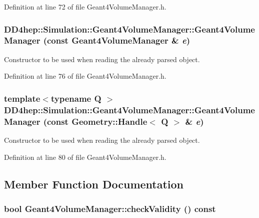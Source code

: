 Definition at line 72 of file Geant4VolumeManager.h.\hypertarget{class_d_d4hep_1_1_simulation_1_1_geant4_volume_manager_a8939c354de0d28fbf310fbac7c0c1f2b}{
\subsubsection[{Geant4VolumeManager}]{\setlength{\rightskip}{0pt plus 5cm}DD4hep::Simulation::Geant4VolumeManager::Geant4VolumeManager (const {\bf Geant4VolumeManager} \& {\em e})}}
\label{class_d_d4hep_1_1_simulation_1_1_geant4_volume_manager_a8939c354de0d28fbf310fbac7c0c1f2b}


Constructor to be used when reading the already parsed object. 

Definition at line 76 of file Geant4VolumeManager.h.\hypertarget{class_d_d4hep_1_1_simulation_1_1_geant4_volume_manager_a06b38722fe8d71c1ac3f58fb10c84081}{
\subsubsection[{Geant4VolumeManager}]{\setlength{\rightskip}{0pt plus 5cm}template$<$typename Q $>$ DD4hep::Simulation::Geant4VolumeManager::Geant4VolumeManager (const {\bf Geometry::Handle}$<$ Q $>$ \& {\em e})}}
\label{class_d_d4hep_1_1_simulation_1_1_geant4_volume_manager_a06b38722fe8d71c1ac3f58fb10c84081}


Constructor to be used when reading the already parsed object. 

Definition at line 80 of file Geant4VolumeManager.h.

\subsection{Member Function Documentation}
\hypertarget{class_d_d4hep_1_1_simulation_1_1_geant4_volume_manager_aeaa8e42fc31052407236690c59029580}{
\subsubsection[{checkValidity}]{\setlength{\rightskip}{0pt plus 5cm}bool Geant4VolumeManager::checkValidity () const}}
\label{class_d_d4hep_1_1_simulation_1_1_geant4_volume_manager_aeaa8e42fc31052407236690c59029580}


